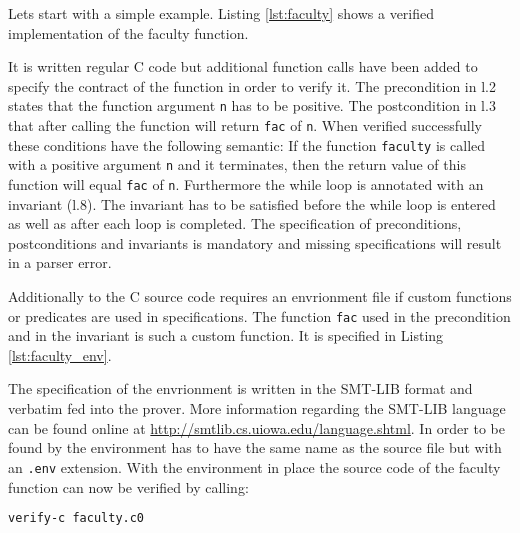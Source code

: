 \documentclass[12pt]{article}
\begin{document}
Lets start with a simple example. Listing \ref{lst:faculty} shows a verified implementation of the faculty function.

\begin{minipage}{\linewidth}

\end{minipage}

It is written regular C code but additional function calls have been added to specify the contract of the function in order to verify it. 
The precondition in l.2 states that the function argument \texttt{n} has to be positive. 
The postcondition in l.3 that after calling the function will return \texttt{fac} of \texttt{n}.
When verified successfully these conditions have the following semantic: 
If the function \texttt{faculty} is called with a positive argument \texttt{n} and it terminates, then the return value of this function will equal \texttt{fac} of \texttt{n}.
Furthermore the while loop is annotated with an invariant (l.8).
The invariant has to be satisfied before the while loop is entered as well as after each loop is completed.
The specification of preconditions, postconditions and invariants is mandatory and missing specifications will result in a parser error.

Additionally to the C source code \verifyc requires an envrionment file if custom functions or predicates are used in specifications. 
The function \texttt{fac} used in the precondition and in the invariant is such a custom function.
It is specified in Listing \ref{lst:faculty_env}.

\begin{minipage}{\linewidth}

\end{minipage}

The specification of the envrionment is written in the SMT-LIB format and verbatim fed into the \zthree prover.
More information regarding the SMT-LIB language can be found online at \url{http://smtlib.cs.uiowa.edu/language.shtml}. In order to be found by \verifyc the environment has to have the same name as the source file but with an \texttt{.env} extension.
With the environment in place the source code of the faculty function can now be verified by calling:

\begin{lstlisting}[language=bash]
verify-c faculty.c0
\end{lstlisting}
\end{document}
